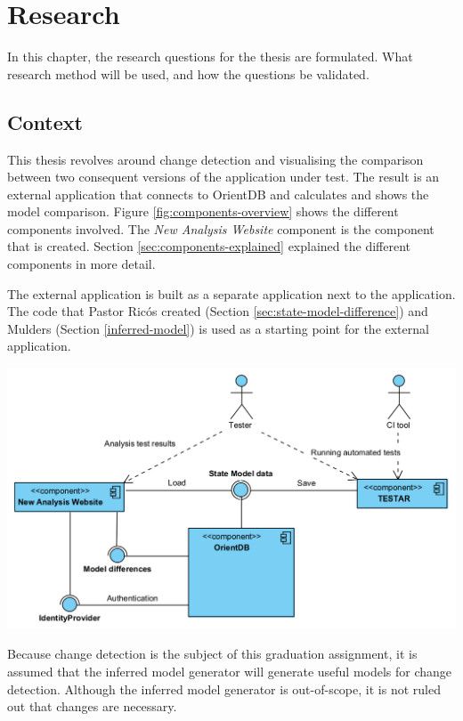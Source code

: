 \chapter{Research} \label{questions}
In this chapter, the research questions for the thesis are formulated. What research method will be used, and how the questions be validated.

\section{Context}
This thesis revolves around change detection and visualising the comparison between two consequent versions of the application under test. The result is an external application that connects to OrientDB and calculates and shows the model comparison. Figure \ref{fig:components-overview} shows the different components involved. The \textit{New Analysis Website} component is the component that is created. Section \ref{sec:components-explained} explained the different components in more detail.

The external application is built as a separate application next to the \testar application. The code that Pastor Ricós created (Section \ref{sec:state-model-difference}) and Mulders (Section \ref{inferred-model}) is used as a starting point for the external application. 

\begingroup
\captionsetup{type=figure}
\includegraphics[scale=0.4]{images/3-UML-high-level.png}
\label{fig:components-overview}
\endgroup

Because change detection is the subject of this graduation assignment, it is assumed that the inferred model generator will generate useful models for change detection. Although the inferred model generator is out-of-scope, it is not ruled out that changes are necessary.

